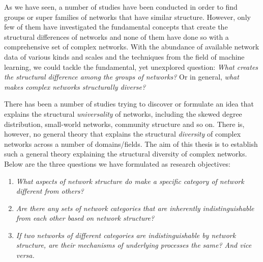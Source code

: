 	As we have seen, a number of studies have been conducted in order to find groups or super families of networks that have similar structure. However, only few of them have investigated the fundamental concepts that create the structural differences of networks and none of them have done so with a comprehensive set of complex networks. With the abundance of available network data of various kinds and scales and the techniques from the field of machine learning, we could tackle the fundamental, yet unexplored question: \textit{What creates the structural difference among the groups of networks? } Or in general, \textit{what makes complex networks structurally diverse?} 
	
	 There has been a number of studies trying to discover or formulate an idea that explains the structural \textit{universality} of networks, including the skewed degree distribution, small-world networks, community structure and so on. There is, however, no general theory that explains the structural \textit{diversity} of complex networks across a number of domains/fields. The aim of  this thesis is to establish such a general theory explaining the structural diversity of complex networks. Below are the three  questions we have formulated as research objectives:

\begin{enumerate}
	\item \textit{What aspects of network structure do make a specific category of network different from others?}
	\item \textit{Are there any sets of network categories that are inherently indistinguishable from each other based on network structure?} 
	\item \textit{If two networks of different categories are indistinguishable by network structure, are their mechanisms of underlying processes the same? And vice versa.}
\end{enumerate}

